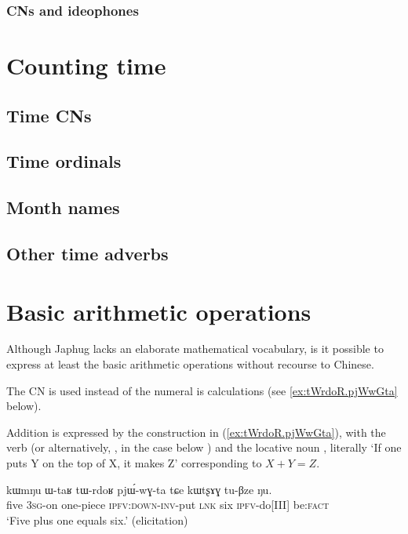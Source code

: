 \subsubsection{CNs and ideophones}   \label{sec:CN.ideophones}
\section{Counting time} \label{sec:time}
\subsection{Time CNs} \label{sec:CN.time}
 
\subsection{Time ordinals} \label{sec:time.ordinals}
\subsection{Month names} \label{sec:month.names}
\subsection{Other time adverbs} \label{sec:time.adverbs}
\section{Basic arithmetic operations} \label{sec:arithmetic}

Although Japhug lacks an elaborate mathematical vocabulary, is it possible to express at least the basic arithmetic operations without recourse to Chinese. 

The CN  is used instead of the numeral  is calculations (see \ref{ex:tWrdoR.pjWwGta} below).

Addition is expressed by the construction in (\ref{ex:tWrdoR.pjWwGta}), with the verb  (or alternatively, , in the case below ) and the locative noun , literally  `If one puts Y on the top of X, it makes Z' corresponding to $X+Y=Z$.  

\begin{exe}
\ex \label{ex:tWrdoR.pjWwGta}
 \gll kɯmŋu ɯ-taʁ tɯ-rdoʁ pjɯ́-wɣ-ta tɕe kɯtʂɤɣ tu-βze ŋu.  \\
 five \textsc{3sg}-on one-piece \textsc{ipfv}:\textsc{down}-\textsc{inv}-put \textsc{lnk} six \textsc{ipfv}-do[III] be:\textsc{fact} \\
 \glt `Five plus one equals six.' (elicitation)
\end{exe}

